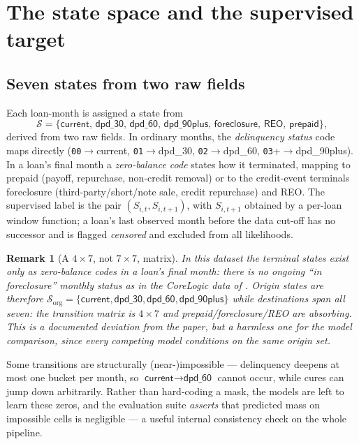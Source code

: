 \documentclass[11pt,a4paper]{article}
\newtheorem{remark}{Remark}
\newcommand{\code}[1]{\texttt{#1}}
\newcommand{\state}[1]{\textsf{#1}}
\begin{document}
\section{The state space and the supervised target}\label{sec:states}

\subsection{Seven states from two raw fields}

Each loan-month is assigned a state from
\[
\mathcal{S}=\{\state{current},\, \state{dpd\_30},\, \state{dpd\_60},\, \state{dpd\_90plus},\, \state{foreclosure},\, \state{REO},\, \state{prepaid}\},
\]
derived from two raw fields. In ordinary months, the \emph{delinquency status} code maps directly (\code{00}$\to$\state{current}, \code{01}$\to$\state{dpd\_30}, \code{02}$\to$\state{dpd\_60}, \code{03}+$\to$\state{dpd\_90plus}). In a loan's final month a \emph{zero-balance code} states how it terminated, mapping to \state{prepaid} (payoff, repurchase, non-credit removal) or to the credit-event terminals \state{foreclosure} (third-party/short/note sale, credit repurchase) and \state{REO}. The supervised label is the pair $(S_{i,t}, S_{i,t+1})$, with $S_{i,t+1}$ obtained by a per-loan window function; a loan's last observed month before the data cut-off has no successor and is flagged \emph{censored} and excluded from all likelihoods.

\begin{remark}[A $4\times 7$, not $7\times 7$, matrix]\label{rem:4x7}
In this dataset the terminal states exist \emph{only} as zero-balance codes in a loan's final month: there is no ongoing ``in foreclosure'' monthly status as in the CoreLogic data of \citet{sirignano2021}. Origin states are therefore $\mathcal{S}_{\mathrm{org}}=\{\state{current}, \state{dpd\_30}, \state{dpd\_60}, \state{dpd\_90plus}\}$ while destinations span all seven: the transition matrix is $4\times 7$ and \state{prepaid}/\state{foreclosure}/\state{REO} are absorbing. This is a documented deviation from the paper, but a harmless one for the model comparison, since every competing model conditions on the same origin set.
\end{remark}

Some transitions are structurally (near-)impossible --- delinquency deepens at most one bucket per month, so $\state{current}\to\state{dpd\_60}$ cannot occur, while cures can jump down arbitrarily. Rather than hard-coding a mask, the models are left to learn these zeros, and the evaluation suite \emph{asserts} that predicted mass on impossible cells is negligible --- a useful internal consistency check on the whole pipeline.
\end{document}
